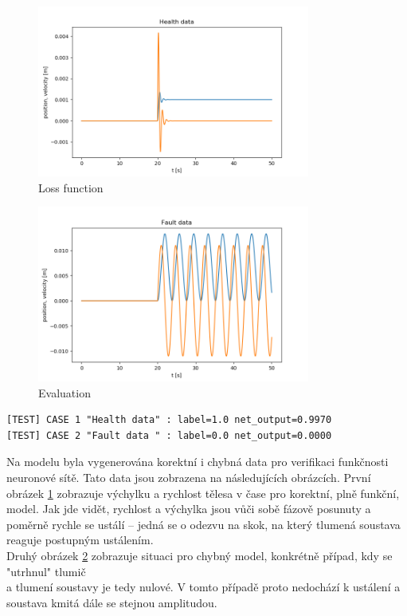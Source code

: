 \documentclass[11pt]{article}
\begin{document}
\begin{figure}[h!]
    \centering
    \includegraphics[width=0.8\textwidth]{health.png}
    \caption{Loss function}
    \label{fig:health}
\end{figure}

\begin{figure}[h!]
    \centering
    \includegraphics[width=0.8\textwidth]{fault.png}
    \caption{Evaluation}
    \label{fig:fault}
\end{figure}

\begin{verbatim}
[TEST] CASE 1 "Health data" : label=1.0 net_output=0.9970
[TEST] CASE 2 "Fault data " : label=0.0 net_output=0.0000
\end{verbatim}

Na modelu byla vygenerována korektní i chybná data pro verifikaci
funkčnosti neuronové sítě. Tato data jsou zobrazena na následujících
obrázcích. První obrázek \ref{fig:health} zobrazuje výchylku a rychlost tělesa v čase pro
korektní, plně funkční, model. Jak jde vidět, rychlost a výchylka jsou
vůči sobě fázově posunuty a poměrně rychle se ustálí -- jedná se o
odezvu na skok, na který tlumená soustava reaguje postupným ustálením.
\\
Druhý obrázek \ref{fig:fault} zobrazuje situaci pro chybný model, konkrétně případ, kdy
se "utrhnul" tlumič\\
a tlumení soustavy je tedy nulové. V tomto případě proto nedochází k
ustálení a soustava kmitá dále se stejnou amplitudou.
\end{document}
